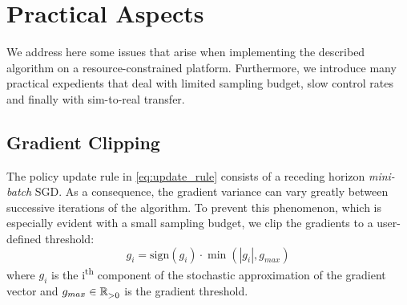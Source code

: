\section{Practical Aspects} \label{sec:practical_aspects}

We address here some issues that arise when implementing the described algorithm on a resource-constrained platform. Furthermore, we introduce many practical expedients that deal with limited sampling budget, slow control rates and finally with sim-to-real transfer.  

\subsection{Gradient Clipping} 
The policy update rule in \eqref{eq:update_rule} consists of a receding horizon \emph{mini-batch} SGD. As a consequence, the gradient variance can vary greatly between successive iterations of the algorithm. To prevent this phenomenon, which is especially evident with a small sampling budget, we clip the gradients to a user-defined threshold:
\begin{equation}
    g_i = \text{sign}(g_i) \cdot \min(|g_i|, g_{max}) 
\end{equation}
where $g_i$ is the i\textsuperscript{th} component of the stochastic approximation of the gradient vector and $g_{max} \in \mathbb{R}^{}_{>0}$ is the gradient threshold.

